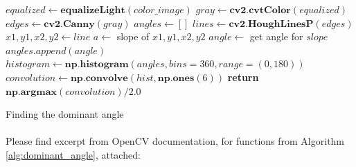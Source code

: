 \begin{algorithm}
	\begin{spacing}{1.5}
	\begin{algorithmic}[1]
			\State $equalized \gets \textbf{equalizeLight}(color\_image)$
			\State $gray \gets \textbf{cv2.cvtColor}(equalized)$
			\State $edges \gets \textbf{cv2.Canny}(gray)$
			\State $angles \gets []$
			\State $lines \gets \textbf{cv2.HoughLinesP}(edges)$
				\State $x1, y1, x2, y2 \gets line$
				\State $a \gets $ slope of $x1, y1, x2, y2$
				\State $angle \gets$ get angle for $slope$
				\State $angles.append(angle)$
			\EndFor
			\State $histogram \gets \textbf{np.histogram}(angles, bins=360, range=(0, 180))$
			\State $convolution \gets \textbf{np.convolve}(hist, \textbf{np.ones}(6))$
			\State \textbf{return} $\textbf{np.argmax}(convolution) / 2.0$
		\EndFunction
	\end{algorithmic}
	\end{spacing}
	\caption{Finding the dominant angle}
	\label{alg:dominant_angle}
\end{algorithm}

\paragraph{}
Please find excerpt from OpenCV documentation, for functions from Algorithm \ref{alg:dominant_angle}, attached: \cite{opencv-docs}

